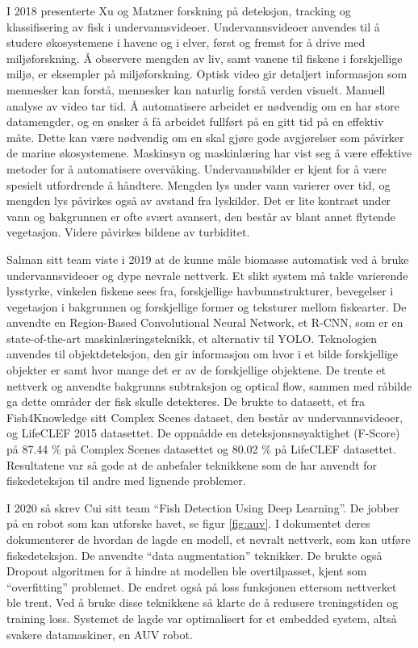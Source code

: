 I 2018 presenterte Xu og Matzner forskning på deteksjon, tracking og klassifisering av fisk i undervannsvideoer. Undervannsvideoer anvendes til å studere økosystemene i havene og i elver, først og fremst for å drive med miljøforskning. Å observere mengden av liv, samt vanene til fiskene i forskjellige miljø, er eksempler på miljøforskning. Optisk video gir detaljert informasjon som mennesker kan forstå, mennesker kan naturlig forstå verden visuelt. Manuell analyse av video tar tid. Å automatisere arbeidet er nødvendig om en har store datamengder, og en ønsker å få arbeidet fullført på en gitt tid på en effektiv måte. Dette kan være nødvendig om en skal gjøre gode avgjørelser som påvirker de marine økosystemene. Maskinsyn og maskinlæring har vist seg å være effektive metoder for å automatisere overvåking. Undervannsbilder er kjent for å være spesielt utfordrende å håndtere. Mengden lys under vann varierer over tid, og mengden lys påvirkes også av avstand fra lyskilder. Det er lite kontrast under vann og bakgrunnen er ofte svært avansert, den består av blant annet flytende vegetasjon. Videre påvirkes bildene av turbiditet. \cite{Xu og Matzner 2018}

Salman sitt team viste i 2019 at de kunne måle biomasse automatisk ved å bruke undervannsvideoer og dype nevrale nettverk.  Et slikt system må takle varierende lysstyrke, vinkelen fiskene sees fra, forskjellige havbunnstrukturer, bevegelser i vegetasjon i bakgrunnen og forskjellige former og teksturer mellom fiskearter. De anvendte en Region-Based Convolutional Neural Network, et R-CNN, som er en state-of-the-art maskinlæringsteknikk, et alternativ til YOLO. Teknologien anvendes til objektdeteksjon, den gir informasjon om hvor i et bilde forskjellige objekter er samt hvor mange det er av de forskjellige objektene. De trente et nettverk og anvendte bakgrunns subtraksjon og optical flow, sammen med råbilde ga dette områder der fisk skulle detekteres. De brukte to datasett, et fra Fish4Knowledge sitt Complex Scenes dataset, den består av undervannsvideoer, og LifeCLEF 2015 datasettet. De oppnådde en deteksjonsnøyaktighet (F-Score) på 87.44 \% på Complex Scenes datasettet og 80.02 \% på LifeCLEF datasettet. Resultatene var så gode at de anbefaler teknikkene som de har anvendt for fiskedeteksjon til andre med lignende problemer. \cite{Salman m.fl. 2019}

I 2020 så skrev Cui sitt team ``Fish Detection Using Deep Learning''. De jobber på en robot som kan utforske havet, se figur \ref{fig:auv}. I dokumentet deres dokumenterer de hvordan de lagde en modell, et nevralt nettverk, som kan utføre fiskedeteksjon. De anvendte ``data augmentation'' teknikker. De brukte også Dropout algoritmen for å hindre at modellen ble overtilpasset, kjent som ``overfitting'' problemet. De endret også på loss funksjonen ettersom nettverket ble trent. Ved å bruke disse teknikkene så klarte de å redusere treningstiden og training loss. Systemet de lagde var optimalisert for et embedded system, altså svakere datamaskiner, en AUV robot. \cite{Cui m.fl. 2020}

